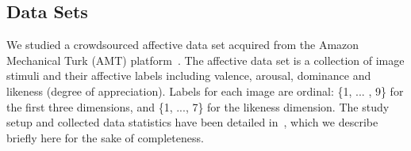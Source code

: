 \documentclass[10pt,journal,letterpaper,compsoc,twoside]{IEEEtran}
\begin{document}
\subsection{Data Sets}



We studied a crowdsourced affective data set acquired from 
the Amazon Mechanical Turk (AMT) platform~\cite{xin2016}.
The affective data set is a collection of image stimuli and their affective labels
including valence, arousal, dominance and likeness (degree of appreciation). 
Labels for each image are ordinal: \{1, ... , 9\} for the first
three dimensions, and \{1, ..., 7\} for the likeness dimension. 
{The study setup and collected data statistics have been detailed in~\citep{xin2016}, which
we describe briefly here for the sake of completeness. }
\end{document}
